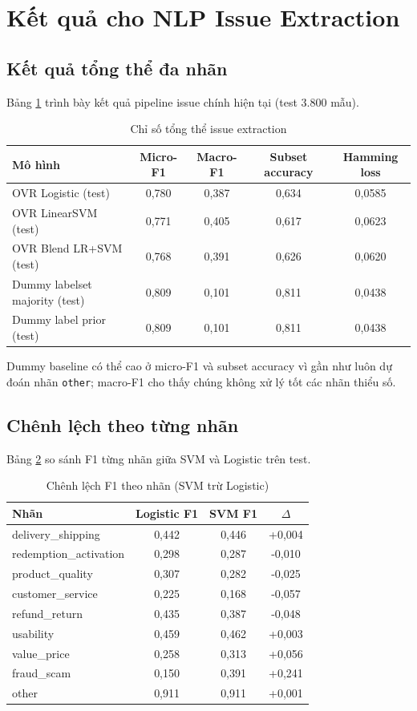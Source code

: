 ﻿\documentclass[12pt,a4paper]{article}
\begin{document}
\section{Kết quả cho NLP Issue Extraction}
\subsection{Kết quả tổng thể đa nhãn}
Bảng \ref{tab:issue_overall_vi} trình bày kết quả pipeline issue chính hiện tại (test 3.800 mẫu).

\begin{table}[H]
\centering
\caption{Chỉ số tổng thể issue extraction}
\label{tab:issue_overall_vi}
\begin{tabular}{lcccc}
\toprule
Mô hình & Micro-F1 & Macro-F1 & Subset accuracy & Hamming loss \\
\midrule
OVR Logistic (test) & 0,780 & 0,387 & 0,634 & 0,0585 \\
OVR LinearSVM (test) & 0,771 & 0,405 & 0,617 & 0,0623 \\
OVR Blend LR+SVM (test) & 0,768 & 0,391 & 0,626 & 0,0620 \\
Dummy labelset majority (test) & 0,809 & 0,101 & 0,811 & 0,0438 \\
Dummy label prior (test) & 0,809 & 0,101 & 0,811 & 0,0438 \\
\bottomrule
\end{tabular}
\end{table}

Dummy baseline có thể cao ở micro-F1 và subset accuracy vì gần như luôn dự đoán nhãn \texttt{other}; macro-F1 cho thấy chúng không xử lý tốt các nhãn thiểu số.

\subsection{Chênh lệch theo từng nhãn}
Bảng \ref{tab:issue_delta_vi} so sánh F1 từng nhãn giữa SVM và Logistic trên test.

\begin{table}[H]
\centering
\caption{Chênh lệch F1 theo nhãn (SVM trừ Logistic)}
\label{tab:issue_delta_vi}
\begin{tabular}{lccc}
\toprule
Nhãn & Logistic F1 & SVM F1 & $\Delta$ \\
\midrule
delivery\_shipping & 0,442 & 0,446 & +0,004 \\
redemption\_activation & 0,298 & 0,287 & -0,010 \\
product\_quality & 0,307 & 0,282 & -0,025 \\
customer\_service & 0,225 & 0,168 & -0,057 \\
refund\_return & 0,435 & 0,387 & -0,048 \\
usability & 0,459 & 0,462 & +0,003 \\
value\_price & 0,258 & 0,313 & +0,056 \\
fraud\_scam & 0,150 & 0,391 & +0,241 \\
other & 0,911 & 0,911 & +0,001 \\
\bottomrule
\end{tabular}
\end{table}
\end{document}
